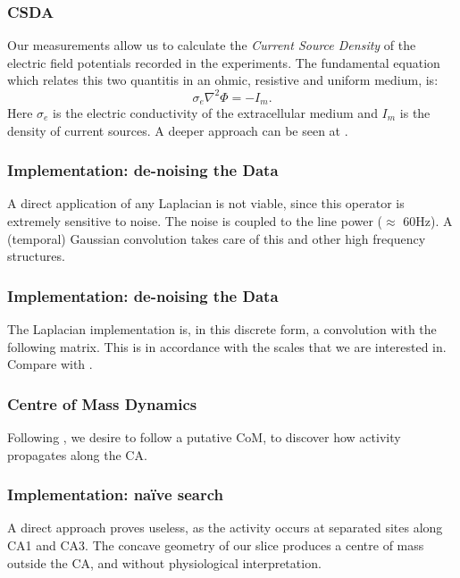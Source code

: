 \documentclass[xetex,mathserif,serif]{beamer}
\begin{document}
  \begin{frame}
    \frametitle{CSDA}
    Our measurements allow us to calculate the \emph{Current Source Density}
    of the electric field potentials  recorded in the experiments.
    The fundamental equation which relates this two quantitis 
    in an ohmic, resistive and uniform medium,
    is: 
    \begin{equation}
      \sigma_e \nabla^2 \Phi = -I_m.
    \end{equation}
    Here $\sigma_e$ is the electric conductivity of the extracellular medium
    and $I_m$ is the density of current sources. A deeper approach
    can be seen at \cite{Bedard11}.
    
  \end{frame}

   \begin{frame}
     \frametitle{Implementation: de-noising the Data}
     A direct application of any Laplacian is not viable, since
     this operator is extremely sensitive to noise. The noise is coupled
     to the line power ($\approx$ 60Hz). 
     A (temporal) Gaussian convolution takes care
     of this and other high frequency structures.
     
  \end{frame}


  \begin{frame}
     \frametitle{Implementation: de-noising the Data}
     The Laplacian implementation is, in this discrete form, a convolution
     with the following matrix. This is in accordance with the
     scales that we are interested in. Compare with \cite{Vaknin88}.
    
  \end{frame}


  \begin{frame}
     \frametitle{Centre of Mass Dynamics}
     Following \cite{Manjarrez07}, we desire to follow a putative CoM,
     to discover how activity propagates along the CA.
     
  \end{frame}


  

  \begin{frame}
     \frametitle{Implementation: naïve search}
     A direct approach proves useless, as the activity occurs at separated
     sites along CA1 and CA3. The concave geometry of our slice
     produces a centre of mass outside the CA, and without physiological
     interpretation.
  \end{frame}
\end{document}
